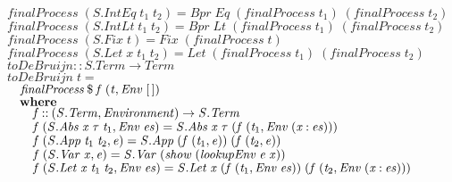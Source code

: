 \documentclass[10pt]{article}
\newcommand{\Conid}[1]{\mathit{#1}}
\newcommand{\Varid}[1]{\mathit{#1}}
\begin{document}
\begin{hscode}
${\Varid{finalProcess}\;(\Conid{\Conid{S}.IntEq}\;\Varid{t}_{1}\;\Varid{t}_{2})\mathrel{=}\Conid{Bpr}\;\Conid{Eq}\;(\Varid{finalProcess}\;\Varid{t}_{1})\;(\Varid{finalProcess}\;\Varid{t}_{2})}$\\
${\Varid{finalProcess}\;(\Conid{\Conid{S}.IntLt}\;\Varid{t}_{1}\;\Varid{t}_{2})\mathrel{=}\Conid{Bpr}\;\Conid{Lt}\;(\Varid{finalProcess}\;\Varid{t}_{1})\;(\Varid{finalProcess}\;\Varid{t}_{2})}$\\
${\Varid{finalProcess}\;(\Conid{\Conid{S}.Fix}\;\Varid{t})\mathrel{=}\Conid{Fix}\;(\Varid{finalProcess}\;\Varid{t})}$\\
${\Varid{finalProcess}\;(\Conid{\Conid{S}.Let}\;\Varid{x}\;\Varid{t}_{1}\;\Varid{t}_{2})\mathrel{=}\Conid{Let}\;(\Varid{finalProcess}\;\Varid{t}_{1})\;(\Varid{finalProcess}\;\Varid{t}_{2})}$\\
${}$\\
${}$\\
${\Varid{toDeBruijn}\mathbin{::}\Conid{\Conid{S}.Term}\to \Conid{Term}}$\\
${\Varid{toDeBruijn}\;\Varid{t}\mathrel{=}}$\\
${\hskip1.00em\relax\Varid{finalProcess}\mathbin{\$}\Varid{f}\;(\Varid{t},\Conid{Env}\;[\mskip1.5mu \mskip1.5mu])}$\\
${\hskip1.00em\relax\mathbf{where}}$\\
${\hskip1.00em\relax\hskip1.00em\relax\Varid{f}\mathbin{::}(\Conid{\Conid{S}.Term},\Conid{Environment})\to \Conid{\Conid{S}.Term}}$\\
${\hskip1.00em\relax\hskip1.00em\relax\Varid{f}\;(\Conid{\Conid{S}.Abs}\;\Varid{x}\;\tau\;\Varid{t}_{1},\Conid{Env}\;\Varid{es})\mathrel{=}\Conid{\Conid{S}.Abs}\;\Varid{x}\;\tau\;(\Varid{f}\;(\Varid{t}_{1},\Conid{Env}\;(\Varid{x}\mathbin{:}\Varid{es})))}$\\
${\hskip1.00em\relax\hskip1.00em\relax\Varid{f}\;(\Conid{\Conid{S}.App}\;\Varid{t}_{1}\;\Varid{t}_{2},\Varid{e})\mathrel{=}\Conid{\Conid{S}.App}\;(\Varid{f}\;(\Varid{t}_{1},\Varid{e}))\;(\Varid{f}\;(\Varid{t}_{2},\Varid{e}))}$\\
${\hskip1.00em\relax\hskip1.00em\relax\Varid{f}\;(\Conid{\Conid{S}.Var}\;\Varid{x},\Varid{e})\mathrel{=}\Conid{\Conid{S}.Var}\;(\Varid{show}\;(\Varid{lookupEnv}\;\Varid{e}\;\Varid{x}))}$\\
${\hskip1.00em\relax\hskip1.00em\relax\Varid{f}\;(\Conid{\Conid{S}.Let}\;\Varid{x}\;\Varid{t}_{1}\;\Varid{t}_{2},\Conid{Env}\;\Varid{es})\mathrel{=}\Conid{\Conid{S}.Let}\;\Varid{x}\;(\Varid{f}\;(\Varid{t}_{1},\Conid{Env}\;\Varid{es}))\;(\Varid{f}\;(\Varid{t}_{2},\Conid{Env}\;(\Varid{x}\mathbin{:}\Varid{es})))}$\\

\end{hscode}
\end{document}
